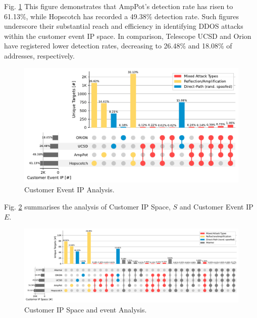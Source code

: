 Fig. \ref{fig:customereventip} This figure demonstrates that AmpPot's detection rate has risen to 61.13\%, while Hopscotch has recorded a 49.38\% detection rate. Such figures underscore their substantial reach and efficiency in identifying DDOS attacks within the customer event IP space. In comparison, Telescope UCSD and Orion have registered lower detection rates, decreasing to 26.48\% and 18.08\% of addresses, respectively.

\begin{figure}[htbp]
    \centering
    \includegraphics[scale=0.4]{graphs/space_event.pdf}
    \caption{Customer Event IP Analysis.}
    \label{fig:customereventip}
\end{figure}


Fig. \ref{fig:Mappedaddressanalysis} summarises the analysis of Customer IP Space, $S$ and Customer Event IP $E$.
\begin{figure}[htbp]
    \centering
    \includegraphics[scale=0.48]{graphs/noir3.pdf}
    \caption{Customer IP Space and event Analysis.}
    \label{fig:Mappedaddressanalysis}
\end{figure}



